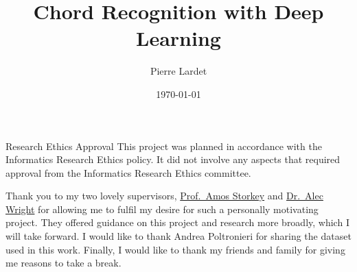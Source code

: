 \begin{preliminary}

    \title{Chord Recognition with Deep Learning}
    
    \author{Pierre Lardet}
    
    
    
    
    \date{\today}
    
    
    \maketitle
    
    \newenvironment{ethics}
       {\begin{frontenv}{Research Ethics Approval}{\LARGE}}
       {\end{frontenv}\newpage}
    
    \begin{ethics}
    This project was planned in accordance with the Informatics Research
    Ethics policy. It did not involve any aspects that required approval
    from the Informatics Research Ethics committee.
    
    \standarddeclaration
    \end{ethics}
    
    
    \begin{acknowledgements}
    Thank you to my two lovely supervisors, \hyperlink{https://homepages.inf.ed.ac.uk/amos/index.html}{Prof.~Amos Storkey} and \hyperlink{https://www.acoustics.ed.ac.uk/people/dr-alec-wright/}{Dr.~Alec Wright} for allowing me to fulfil my desire for such a personally motivating project. They offered guidance on this project and research more broadly, which I will take forward. I would like to thank Andrea Poltronieri for sharing the dataset used in this work. Finally, I would like to thank my friends and family for giving me reasons to take a break.
    \end{acknowledgements}
    
    
    \tableofcontents
    \end{preliminary}